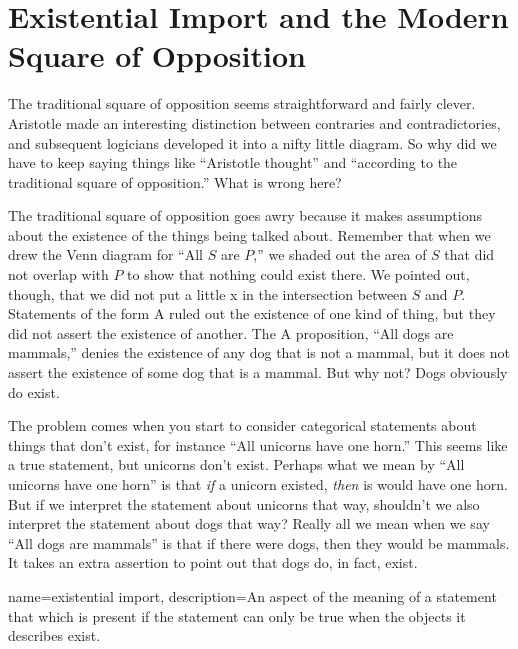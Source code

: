 
\section{Existential Import and the Modern Square of Opposition}
\label{sec:ExistentialImport}

The traditional square of opposition seems straightforward and fairly clever. Aristotle made an interesting distinction between contraries and contradictories, and subsequent logicians developed it into a nifty little diagram. So why did we have to keep saying things like ``Aristotle thought'' and ``according to the traditional square of opposition.'' What is wrong here?

The traditional square of opposition goes awry because it makes assumptions about the existence of the things being talked about. Remember that when we drew the Venn diagram for ``All $S$ are $P$,'' we shaded out the area of $S$ that did not overlap with $P$ to show that nothing could exist there. We pointed out, though, that we did not put a little x in the intersection between $S$ and $P$. Statements of the form A ruled out the existence of one kind of thing, but they did not assert the existence of another. The A proposition, ``All dogs are mammals,'' denies the existence of any dog that is not a mammal, but it does not assert the existence of some dog that is a mammal. But why not? Dogs obviously do exist.

The problem comes when you start to consider categorical statements about things that don't exist, for instance ``All unicorns have one horn.'' This seems like a true statement, but unicorns don't exist. Perhaps what we mean by ``All unicorns have one horn'' is that \emph{if} a unicorn existed, \emph{then} is would have one horn. But if we interpret the statement about unicorns that way, shouldn't we also interpret the statement about dogs that way? Really all we mean when we say ``All dogs are mammals'' is that if there were dogs, then they would be mammals. It takes an extra assertion to point out that dogs do, in fact, exist.

{
name=existential import,
description={An aspect of the meaning of a statement that which is present if the statement can only be true when the objects it describes exist.}
}

